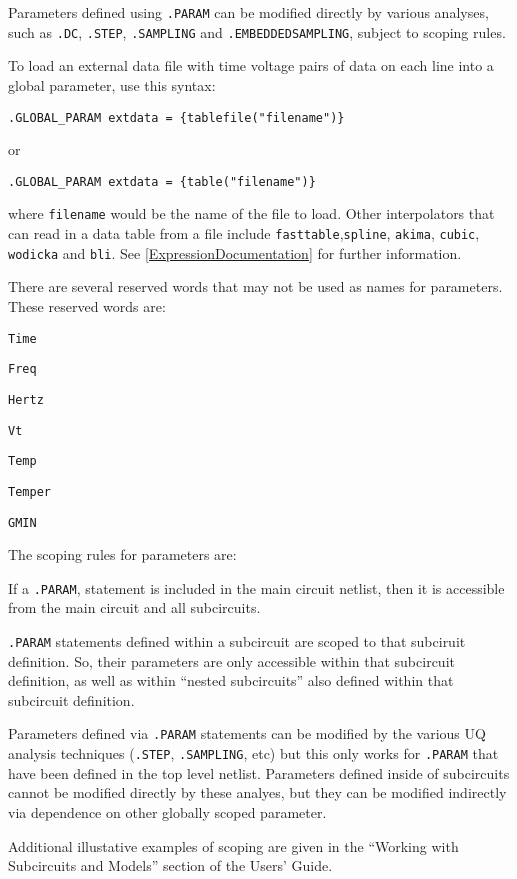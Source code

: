 \begin{Command}
Parameters defined using \texttt{.PARAM} can be modified directly by various analyses, such as \texttt{.DC},   
  \texttt{.STEP}, \texttt{.SAMPLING} and \texttt{.EMBEDDEDSAMPLING}, subject to scoping rules. 

To load an external data file with time voltage pairs of data on each 
line into a global parameter, use this syntax:

\texttt{.GLOBAL\_PARAM extdata = \{tablefile("filename")\}}

or

\texttt{.GLOBAL\_PARAM extdata = \{table("filename")\}}

where \texttt{filename} would be the name of the file to load.  
Other interpolators that can read in a data table from a file 
include \texttt{fasttable},\texttt{spline}, \texttt{akima}, \texttt{cubic}, 
\texttt{wodicka} and \texttt{bli}.  See \ref{ExpressionDocumentation} 
for further information.  

There are several reserved words that may not be used as names for parameters.  These reserved words are:
\begin{XyceItemize}
\item \verb+Time+
\item \verb+Freq+ 
\item \verb+Hertz+ 
\item \verb+Vt+
\item \verb+Temp+
\item \verb+Temper+
\item \verb+GMIN+
\end{XyceItemize}

The scoping rules for parameters are:
\begin{XyceItemize}
\item If a \texttt{.PARAM}, statement is included in the main circuit 
netlist, then it is accessible from the main circuit and all subcircuits. 
\item \texttt{.PARAM} statements defined within a subcircuit are scoped 
to that subciruit definition.  So, their parameters are only accessible within 
that subcircuit definition, as well as within ``nested subcircuits'' also 
defined within that subcircuit definition.
\item Parameters defined via \texttt{.PARAM} statements can be modified by the 
  various UQ analysis techniques (\texttt{.STEP}, \texttt{.SAMPLING}, etc) but
  this only works for \texttt{.PARAM} that have been defined in the top level netlist.
  Parameters defined inside of subcircuits cannot be modified directly 
  by these analyes, but they can be modified indirectly via dependence on other 
  globally scoped parameter.
\end{XyceItemize}

Additional illustative examples of scoping are given in the
``Working with Subcircuits and Models'' section of the \Xyce{} Users' 
Guide\UsersGuide. 

\end{Command}


